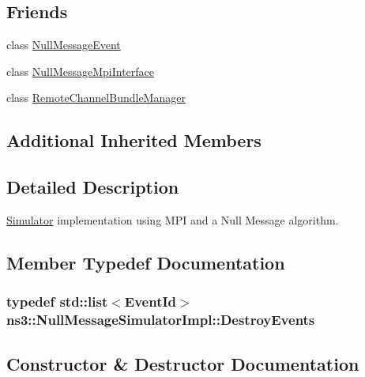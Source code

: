 \subsection*{Friends}
\begin{DoxyCompactItemize}
\item 
class \hyperlink{classns3_1_1NullMessageSimulatorImpl_a43249f5b1c0f407d74e1918edb88a973}{Null\+Message\+Event}
\item 
class \hyperlink{classns3_1_1NullMessageSimulatorImpl_a46a5ccb2fd1ba8fab629cdd3ec174f3d}{Null\+Message\+Mpi\+Interface}
\item 
class \hyperlink{classns3_1_1NullMessageSimulatorImpl_ad4b9415eadfbbaf9cf4c18eb7b6b7eb8}{Remote\+Channel\+Bundle\+Manager}
\end{DoxyCompactItemize}
\subsection*{Additional Inherited Members}


\subsection{Detailed Description}
\hyperlink{classns3_1_1Simulator}{Simulator} implementation using M\+PI and a Null Message algorithm. 

\subsection{Member Typedef Documentation}
\subsubsection[{\texorpdfstring{Destroy\+Events}{DestroyEvents}}]{\setlength{\rightskip}{0pt plus 5cm}typedef {\bf std\+::list}$<${\bf Event\+Id}$>$ {\bf ns3\+::\+Null\+Message\+Simulator\+Impl\+::\+Destroy\+Events}\hspace{0.3cm}{\ttfamily [private]}}\hypertarget{classns3_1_1NullMessageSimulatorImpl_ab649c69a3c50995571fbf4f9c501fd9c}{}\label{classns3_1_1NullMessageSimulatorImpl_ab649c69a3c50995571fbf4f9c501fd9c}


\subsection{Constructor \& Destructor Documentation}
